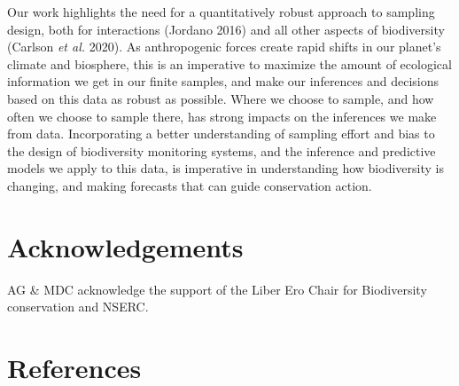 \documentclass[11pt]{article}
\begin{document}
Our work highlights the need for a quantitatively robust approach to
sampling design, both for interactions (Jordano 2016) and all other
aspects of biodiversity (Carlson \emph{et al.} 2020). As anthropogenic
forces create rapid shifts in our planet's climate and biosphere, this
is an imperative to maximize the amount of ecological information we get
in our finite samples, and make our inferences and decisions based on
this data as robust as possible. Where we choose to sample, and how
often we choose to sample there, has strong impacts on the inferences we
make from data. Incorporating a better understanding of sampling effort
and bias to the design of biodiversity monitoring systems, and the
inference and predictive models we apply to this data, is imperative in
understanding how biodiversity is changing, and making forecasts that
can guide conservation action.

\hypertarget{acknowledgements}{%
\section{Acknowledgements}\label{acknowledgements}}

AG \& MDC acknowledge the support of the Liber Ero Chair for
Biodiversity conservation and NSERC.

\hypertarget{references}{%
\section*{References}\label{references}}
\end{document}
